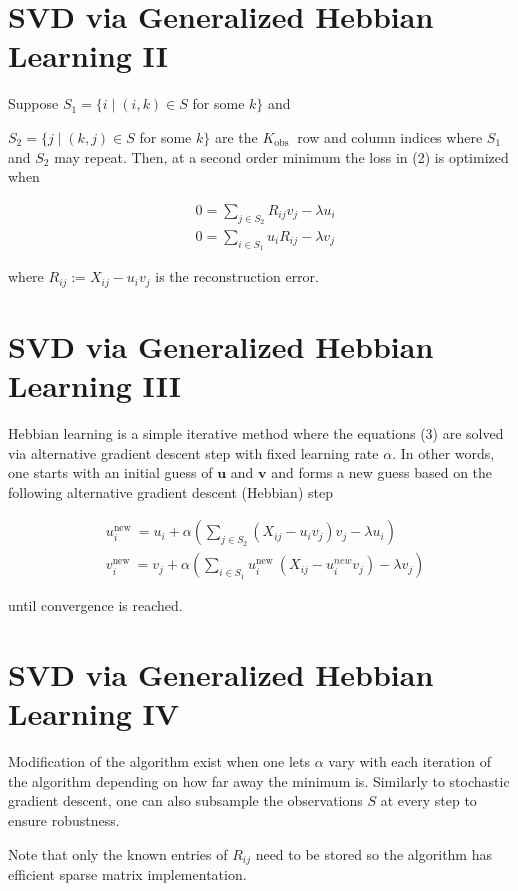 \documentclass[11pt]{article}
\theoremstyle{plain} %
\theoremstyle{remark}
\begin{document}
\section*{SVD via Generalized Hebbian Learning II}
Suppose $S_{1}=\{i \mid(i, k) \in S$ for some $k\}$ and

$S_{2}=\{j \mid(k, j) \in S$ for some $k\}$ are the $K_{\text {obs }}$ row and column indices where $S_{1}$ and $S_{2}$ may repeat. Then, at a second order minimum the loss in (2) is optimized when

$$
\begin{aligned}
& 0=\sum_{j \in S_{2}} R_{i j} v_{j}-\lambda u_{i} \\
& 0=\sum_{i \in S_{1}} u_{i} R_{i j}-\lambda v_{j}
\end{aligned}
$$

where $R_{i j}:=X_{i j}-u_{i} v_{j}$ is the reconstruction error.

\section*{SVD via Generalized Hebbian Learning III}
Hebbian learning is a simple iterative method where the equations (3) are solved via alternative gradient descent step with fixed learning rate $\alpha$. In other words, one starts with an initial guess of $\mathbf{u}$ and $\mathbf{v}$ and forms a new guess based on the following alternative gradient descent (Hebbian) step

$$
\begin{aligned}
& u_{i}^{\text {new }}=u_{i}+\alpha\left(\sum_{j \in S_{2}}\left(X_{i j}-u_{i} v_{j}\right) v_{j}-\lambda u_{i}\right) \\
& v_{i}^{\text {new }}=v_{j}+\alpha\left(\sum_{i \in S_{1}} u_{i}^{\text {new }}\left(X_{i j}-u_{i}^{n e w} v_{j}\right)-\lambda v_{j}\right)
\end{aligned}
$$

until convergence is reached.

\section*{SVD via Generalized Hebbian Learning IV}
Modification of the algorithm exist when one lets $\alpha$ vary with each iteration of the algorithm depending on how far away the minimum is. Similarly to stochastic gradient descent, one can also subsample the observations $S$ at every step to ensure robustness.

Note that only the known entries of $R_{i j}$ need to be stored so the algorithm has efficient sparse matrix implementation.
\end{document}

